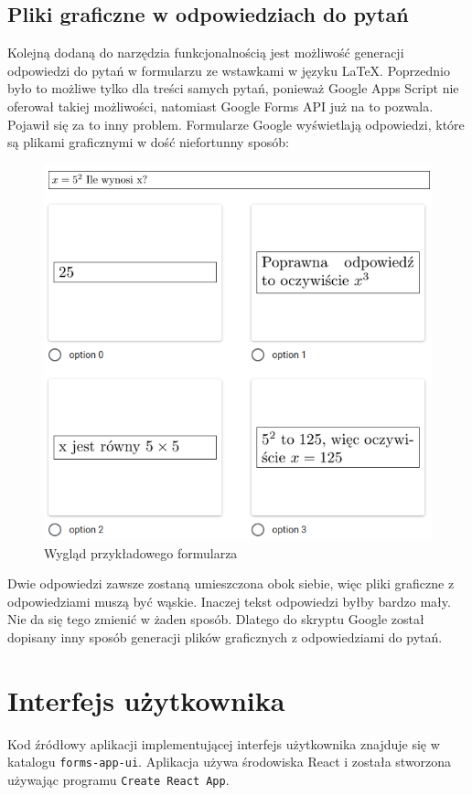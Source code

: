\subsection{Pliki graficzne w odpowiedziach do pytań}
Kolejną dodaną do narzędzia funkcjonalnością jest możliwość generacji odpowiedzi do pytań
w formularzu ze wstawkami w języku \LaTeX. Poprzednio było to możliwe tylko dla treści samych
pytań, ponieważ Google Apps Script nie oferował takiej możliwości, natomiast Google Forms API 
już na to pozwala. Pojawił się za to inny problem. Formularze Google wyświetlają odpowiedzi,
które są plikami graficznymi
w dość niefortunny sposób:
\begin{figure}[H]
  \centering
   \includegraphics[scale=0.50]{odpowiedzi.png}
   \caption{Wygląd przykładowego formularza}
   \label{fig:1}
 \end{figure}
 Dwie odpowiedzi zawsze zostaną umieszczona obok siebie, więc pliki graficzne z odpowiedziami
 muszą być wąskie. Inaczej tekst odpowiedzi byłby bardzo mały. Nie da się tego zmienić w żaden
 sposób. Dlatego do skryptu Google został
 dopisany inny sposób generacji plików graficznych z odpowiedziami do pytań.

 \section{Interfejs użytkownika}
 Kod źródłowy aplikacji implementującej interfejs użytkownika znajduje się w katalogu
 \texttt{forms-app-ui}. Aplikacja używa środowiska React i została stworzona używając programu
 \texttt{Create React App}.
 